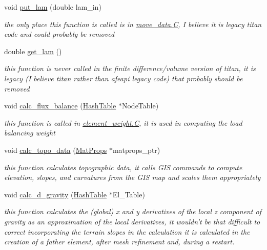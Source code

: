 \begin{CompactItemize}
void \hyperlink{classElement_a92}{put\_\-lam} (double lam\_\-in)
\begin{CompactList}\small\item\em the only place this function is called is in \hyperlink{constant_8h_a21}{move\_\-data.C}, I believe it is legacy titan code and could probably be removed \item\end{CompactList}\item 
double \hyperlink{classElement_a93}{get\_\-lam} ()
\begin{CompactList}\small\item\em this function is never called in the finite difference/volume version of titan, it is legacy (I believe titan rather than afeapi legacy code) that probably should be removed \item\end{CompactList}\item 
void \hyperlink{classElement_a94}{calc\_\-flux\_\-balance} (\hyperlink{classHashTable}{Hash\-Table} $\ast$Node\-Table)
\begin{CompactList}\small\item\em this function is called in \hyperlink{constant_8h_a21}{element\_\-weight.C}, it is used in computing the load balancing weight \item\end{CompactList}\item 
void \hyperlink{classElement_a95}{calc\_\-topo\_\-data} (\hyperlink{structMatProps}{Mat\-Props} $\ast$matprops\_\-ptr)
\begin{CompactList}\small\item\em this function calculates topographic data, it calls GIS commands to compute elevation, slopes, and curvatures from the GIS map and scales them appropriately \item\end{CompactList}\item 
void \hyperlink{classElement_a96}{calc\_\-d\_\-gravity} (\hyperlink{classHashTable}{Hash\-Table} $\ast$El\_\-Table)
\begin{CompactList}\small\item\em this function calculates the (global) x and y derivatives of the local z component of gravity as an approximation of the local derivatives, it wouldn't be that difficult to correct incorporating the terrain slopes in the calculation it is calculated in the creation of a father element, after mesh refinement and, during a restart. \item\end{CompactList}\item 

\end{CompactItemize}

